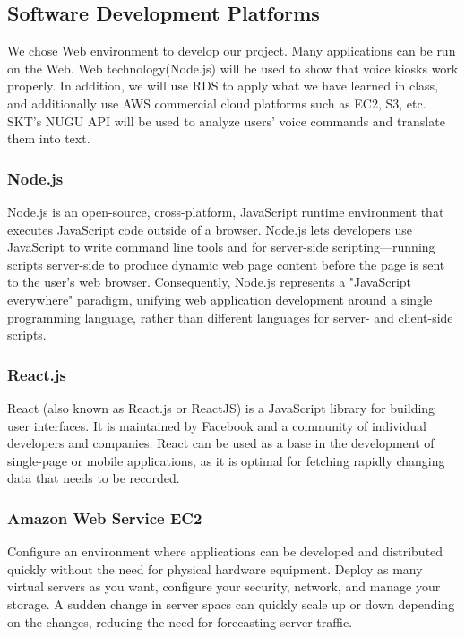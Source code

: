 \documentclass[conference,compsoc]{IEEEtran}
\begin{document}
\subsection{Software Development Platforms}

We chose Web environment to develop our project. Many applications can be run on the Web. Web technology(Node.js) will be used to show that voice kiosks work properly. In addition, we will use RDS to apply what we have learned in class, and additionally use AWS commercial cloud platforms such as EC2, S3, etc. SKT's NUGU API will be used to analyze users' voice commands and translate them into text.

\subsubsection{Node.js}

Node.js is an open-source, cross-platform, JavaScript runtime environment that executes JavaScript code outside of a browser. Node.js lets developers use JavaScript to write command line tools and for server-side scripting—running scripts server-side to produce dynamic web page content before the page is sent to the user's web browser. Consequently, Node.js represents a "JavaScript everywhere" paradigm, unifying web application development around a single programming language, rather than different languages for server- and client-side scripts.

\subsubsection{React.js}

React (also known as React.js or ReactJS) is a JavaScript library for building user interfaces. It is maintained by Facebook and a community of individual developers and companies. React can be used as a base in the development of single-page or mobile applications, as it is optimal for fetching rapidly changing data that needs to be recorded.

\subsubsection{Amazon Web Service EC2}

Configure an environment where applications can be developed and distributed quickly without the need for physical hardware equipment. Deploy as many virtual servers as you want, configure your security, network, and manage your storage. A sudden change in server spacs can quickly scale up or down depending on the changes, reducing the need for forecasting server traffic.
\end{document}
